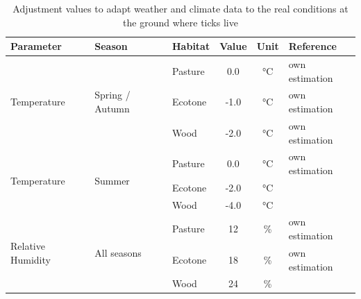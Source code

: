 \documentclass[a4paper, 11pt]{scrartcl}
\begin{document}
\begin{table}[h!]
\caption{Adjustment values to adapt weather and climate data to the real conditions at the ground where ticks live}
\label{tab:micro_climate_adjustments}
\begin{tabularx}{\textwidth}{lllccl}
\toprule
\textbf{Parameter}					& \textbf{Season} 					& \textbf{Habitat}  & \textbf{Value}  & \textbf{Unit} & \textbf{Reference} \\
\midrule
\multirow{3}{*}{Temperature} 		& \multirow{3}{*}{Spring / Autumn}  & Pasture 			&   0.0   		& °C & own estimation \\
									&									& Ecotone 			&   -1.0 	  	& °C & own estimation \\
									&					 				& Wood    			&   -2.0   		& °C & own estimation \\
\midrule
\multirow{3}{*}{Temperature} 		& \multirow{3}{*}{Summer}        	& Pasture 			&   0.0    		& °C & own estimation \\
									&				 	 				& Ecotone 			&  -2.0    		& °C & \cite{Geiger.1995} \\
									&				 	 				& Wood	   			&  -4.0    		& °C & \cite{Bonan.2016} \\
\midrule
\multirow{3}{*}{Relative Humidity}  & \multirow{3}{*}{All seasons}      & Pasture 			&   12   		& \% & own estimation \\
									&				 					& Ecotone 			&   18    		& \% & own estimation \\
									&				 					& Wood    			&   24    		& \% & \cite{Boehnke.2017} \\
\bottomrule
\end{tabularx}
\end{table}



\newpage
\printbibliography[heading = bibintoc, title = {Bibliography}]
\end{document}
